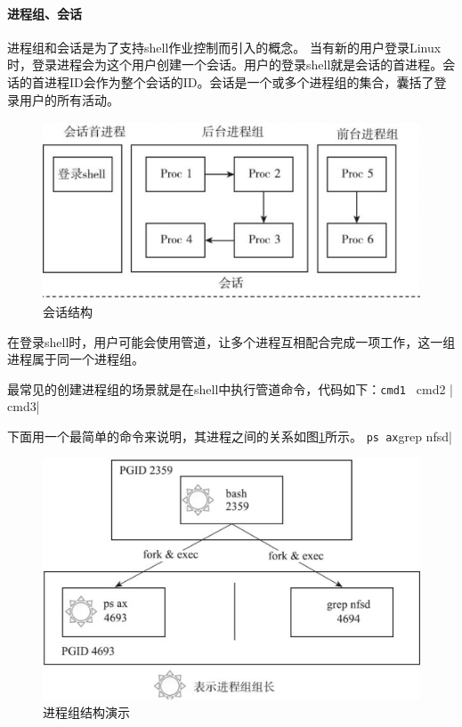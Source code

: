 \documentclass[UTF8,a4paper,12pt]{ctexbook}
\begin{document}
		\paragraph{进程组、会话}
			进程组和会话是为了支持shell作业控制而引入的概念。
			当有新的用户登录Linux时，登录进程会为这个用户创建一个会话。用户的登录shell就是会话的首进程。会话的首进程ID会作为整个会话的ID。会话是一个或多个进程组的集合，囊括了登录用户的所有活动。
				\begin{figure}[H]
					\centering
					\includegraphics[scale=0.5]{huihua.png}
					\caption{会话结构}
				\end{figure}
			
			在登录shell时，用户可能会使用管道，让多个进程互相配合完成一项工作，这一组进程属于同一个进程组。
			
			最常见的创建进程组的场景就是在shell中执行管道命令，代码如下：\verb|cmd1 | cmd2 | cmd3|
			
			下面用一个最简单的命令来说明，其进程之间的关系如图\ref{processG}所示。
			\verb|ps ax|grep nfsd|
				
					\begin{figure}[H]
						\centering
						\includegraphics[scale=0.5]{processGroup.png}
						\caption{进程组结构演示}
						\label{processG}
					\end{figure}
			 
\end{document}

